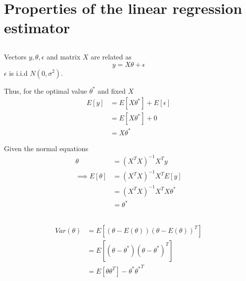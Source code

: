 \documentclass{article}
\begin{document}
\section{Properties of the linear regression estimator}
\subsection{}
Vectors $y, \theta , \epsilon$ and matrix $X$ are related as
\begin{equation}
  \label{eq:1.9}
  y = X \theta + \epsilon
\end{equation}
$\epsilon$ is i.i.d $N(0,\sigma^{2})$.

Thus, for the optimal value $\theta^{*}$ and fixed $X$
\begin{equation}
  \label{eq:1.10}
  \begin{split}
    E[y] &= E[X\theta^{*}] + E[\epsilon]\\
    &= E[X\theta^{*}] + 0\\
    &= X\theta^{*}
  \end{split}
\end{equation}

Given the normal equations
\begin{equation}
  \label{eq:1.11}
  \begin{split}
  \theta &= (X^T X)^{-1}X^T y \\
  \implies E[\theta] &= (X^T X)^{-1}X^T E[y] \\
  &= (X^T X)^{-1}X^T X\theta^{*} \\
  &= \theta^{*}    
  \end{split}
\end{equation}

\subsection{}
\begin{equation}
  \label{eq:1.12}
  \begin{split}
    Var(\theta) &= E\left[(\theta - E(\theta))(\theta - E(\theta))^T\right] \\
    &= E\left[(\theta - \theta^*)(\theta - \theta^*)^T\right] \\
    &= E[\theta \theta^T] - \theta^*{\theta^*}^T
  \end{split}
\end{equation}
\end{document}
